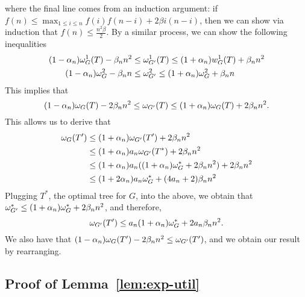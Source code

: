     where the final line comes from an induction argument: if $f(n) \leq \max_{1 \leq i \leq n} f(i)f(n-i) + 2\beta i(n-i)$, then we can show via induction that $f(n) \leq \frac{n^2\beta}{2}$. By a similar process, we can show the following inequalities
    \begin{align}
    (1-\alpha_n) \omega_{G}^1(T) - \beta_n n^2 &\leq \omega_{G'}^1(T) \leq (1+\alpha_n) w_G^1(T) + \beta_n n^2 \label{eq:cost-decomp1}\\
    (1-\alpha_n) \omega_{G}^2 - \beta_n n &\leq \omega_{G'}^2 \leq (1+\alpha_n) \omega_{G}^2 + \beta_n n \label{eq:cost-decomp2}
    \end{align}
    This implies that
    \[
        (1-\alpha_n) \omega_{G}(T) - 2\beta_n n^2 \leq \omega_{G'}(T) \leq (1+\alpha_n) \omega_{G}(T) + 2\beta_n n^2.
    \]
    This allows us to derive that
    \begin{align*}
        \omega_G(T') &\leq (1+\alpha_n)\omega_{G'}(T') + 2\beta_n n^2 \\
        &\leq (1+\alpha_n) a_n \omega_{G'}(T^*) + 2\beta_n n^2 \\
        &\leq (1+\alpha_n) a_n ((1+\alpha_n) \omega_{G}^* + 2\beta_n n^2) + 2\beta_n n^2 \\
        &\leq (1+2\alpha_n) a_n \omega_{G}^* + (4a_n + 2) \beta_n n^2
    \end{align*}
    Plugging $T^*$, the optimal tree for $G$, into the above, we obtain that $\omega_{G'}^* \leq (1+\alpha_n)\omega_{G}^* + 2\beta_n n^2$, and therefore,
    \[
        \omega_{G'}(T') \leq a_n (1+\alpha_n) \omega_G^* + 2 a_n \beta_n n^2.
    \]
    We also have that $(1-\alpha_n) \omega_{G}(T') - 2\beta_n n^2 \leq \omega_{G'}(T')$, and we obtain our result by rearranging. 

\subsection{Proof of Lemma~\ref{lem:exp-util}}

